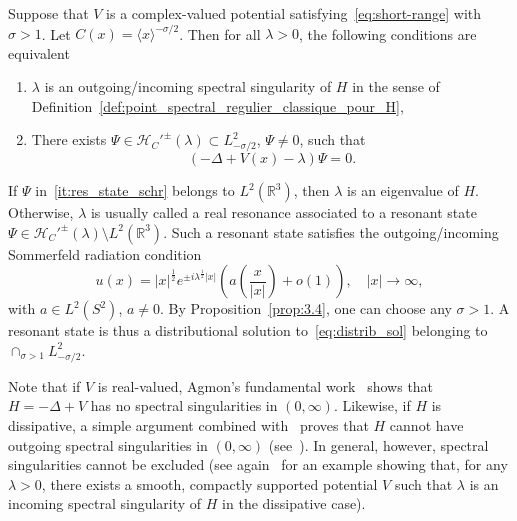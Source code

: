 \documentclass[AHL,Unicode,longabstracts,published]{cedram}
\newcommand{\Hi}{\mathcal{H}}
\newcommand{\R}{\mathbb{R}}
\newcommand*{\romanenumi}{\renewcommand*{\theenumi}{\roman{enumi}}}
\newcommand{\Hi}{\mathcal{H}}
\newcommand{\R}{\mathbb{R}}
\begin{document}
\begin{prop}\label{prop:3.4}
Suppose that $V$ is a complex-valued potential satisfying~\eqref{eq:short-range} with $\sigma>1$. Let $C(x)=\langle x\rangle^{-\sigma/2}$. Then for all $\lambda>0$, the following conditions are equivalent
\begin{enumerate}\romanenumi
\item\label{it:spec_sing_schr}
$\lambda$ is an outgoing/incoming spectral singularity of $H$ in the sense of Definition~\ref{def:point_spectral_regulier_classique_pour_H},
\item\label{it:res_state_schr}
There exists $\Psi\in\Hi_C'^\pm(\lambda) \subset L^2_{-\sigma/2}$, $\Psi\neq0$, such that
\begin{equation}\label{eq:distrib_sol}
(-\Delta+V(x)-\lambda)\Psi=0.
\end{equation}
\end{enumerate}
\end{prop}

If $\Psi$ in~\eqref{it:res_state_schr} belongs to $L^2(\R^3)$, then $\lambda$ is an eigenvalue of $H$. Otherwise, $\lambda$ is usually called a real resonance associated to a resonant state $\Psi\in\Hi_C'^\pm(\lambda)\setminus L^2(\R^3)$. Such a resonant state satisfies the outgoing/incoming Sommerfeld radiation condition
\begin{equation*}
u(x)=|x|^{\frac12 } e^{\pm i \lambda^{\frac12} | x |} \left (a \left(\frac{x}{|x|}\right) + o(1) \right), \quad |x| \to \infty,
\end{equation*}
with $a \in L^2(S^2)$, $a\neq 0$. By Proposition~\ref{prop:3.4}, one can choose any $\sigma>1$. A resonant state is thus a distributional solution to~\eqref{eq:distrib_sol} belonging to $\cap_{\sigma>1}L^2_{-\sigma/2}$.

Note that if $V$ is real-valued, Agmon's fundamental work~\cite{Ag75_01} shows that $H=-\Delta+V$ has no spectral singularities in $(0,\infty)$. Likewise, if $H$ is dissipative, a simple argument combined with~\cite{Ag75_01} proves that $H$ cannot have outgoing spectral singularities in $(0,\infty)$ (see~\cite{Wa12_01}). In general, however, spectral singularities cannot be excluded (see again~\cite{Wa12_01} for an example showing that, for any $\lambda>0$, there exists a smooth, compactly supported potential $V$ such that $\lambda$ is an incoming spectral singularity of $H$ in the dissipative case).
\end{document}
